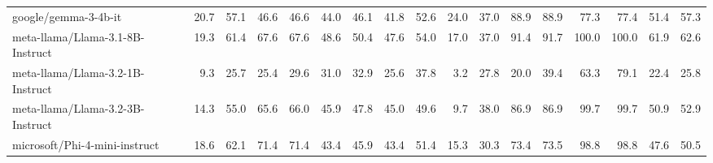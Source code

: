 \documentclass{article}
\begin{document}
\begin{table}[htbp]
\begin{threeparttable}
\begin{adjustbox}{max width=\textwidth}
\begin{tabular}{lrrrrrrrrrrrrrrrr}
google/gemma-3-4b-it & \cellcolor[HTML]{FEFDFC}20.7 & \cellcolor[HTML]{D3E8F1}57.1 & \cellcolor[HTML]{FEF9F7}46.6 & \cellcolor[HTML]{FEF9F6}46.6 & \cellcolor[HTML]{FEFDFD}44.0 & \cellcolor[HTML]{FBE3D8}46.1 & \cellcolor[HTML]{ECF4F9}41.8 & \cellcolor[HTML]{D6E9F2}52.6 & \cellcolor[HTML]{FEF7F4}24.0 & \cellcolor[HTML]{FBE5DB}37.0 & \cellcolor[HTML]{AAD1E5}88.9 & \cellcolor[HTML]{B6D8E9}88.9 & \cellcolor[HTML]{C3DFEC}77.3 & \cellcolor[HTML]{FAD9CB}77.4 & \cellcolor[HTML]{F3F8FB}51.4 & \cellcolor[HTML]{F0F7FA}57.3 \\
meta-llama/Llama-3.1-8B-Instruct & \cellcolor[HTML]{FEF7F4}19.3 & \cellcolor[HTML]{C4DFED}61.4 & \cellcolor[HTML]{D7EAF3}67.6 & \cellcolor[HTML]{D8EAF3}67.6 & \cellcolor[HTML]{F5F9FC}48.6 & \cellcolor[HTML]{FDEEE8}50.4 & \cellcolor[HTML]{DAEBF3}47.6 & \cellcolor[HTML]{D2E7F1}54.0 & \cellcolor[HTML]{FBDFD3}17.0 & \cellcolor[HTML]{FBE5DB}37.0 & \cellcolor[HTML]{A4CEE3}91.4 & \cellcolor[HTML]{ADD3E6}91.7 & \cellcolor[HTML]{92C5DE}100.0 & \cellcolor[HTML]{92C5DE}100.0 & \cellcolor[HTML]{DAEBF3}61.9 & \cellcolor[HTML]{E2EFF6}62.6 \\
meta-llama/Llama-3.2-1B-Instruct & \cellcolor[HTML]{F8CCB9}9.3 & \cellcolor[HTML]{F8C6B0}25.7 & \cellcolor[HTML]{F9D2C1}25.4 & \cellcolor[HTML]{FADACB}29.6 & \cellcolor[HTML]{FBE3D8}31.0 & \cellcolor[HTML]{F7BFA7}32.9 & \cellcolor[HTML]{FBE5DB}25.6 & \cellcolor[HTML]{FDF5F2}37.8 & \cellcolor[HTML]{F5AF91}3.2 & \cellcolor[HTML]{F7C0A8}27.8 & \cellcolor[HTML]{F8C9B4}20.0 & \cellcolor[HTML]{F5B295}39.4 & \cellcolor[HTML]{E2EFF6}63.3 & \cellcolor[HTML]{FBE3D8}79.1 & \cellcolor[HTML]{F9CFBD}22.4 & \cellcolor[HTML]{F8C6B0}25.8 \\
meta-llama/Llama-3.2-3B-Instruct & \cellcolor[HTML]{FBE2D6}14.3 & \cellcolor[HTML]{DBECF4}55.0 & \cellcolor[HTML]{DCECF4}65.6 & \cellcolor[HTML]{DBECF4}66.0 & \cellcolor[HTML]{FCFDFE}45.9 & \cellcolor[HTML]{FCE7DE}47.8 & \cellcolor[HTML]{E2EFF6}45.0 & \cellcolor[HTML]{E1EFF6}49.6 & \cellcolor[HTML]{F8C6B0}9.7 & \cellcolor[HTML]{FCE9E0}38.0 & \cellcolor[HTML]{AED4E6}86.9 & \cellcolor[HTML]{BDDCEB}86.9 & \cellcolor[HTML]{92C5DE}99.7 & \cellcolor[HTML]{94C6DE}99.7 & \cellcolor[HTML]{F4F9FB}50.9 & \cellcolor[HTML]{FCFDFE}52.9 \\
microsoft/Phi-4-mini-instruct & \cellcolor[HTML]{FDF4F0}18.6 & \cellcolor[HTML]{C2DEEC}62.1 & \cellcolor[HTML]{CFE5F0}71.4 & \cellcolor[HTML]{CFE5F0}71.4 & \cellcolor[HTML]{FEFCFB}43.4 & \cellcolor[HTML]{FBE2D7}45.9 & \cellcolor[HTML]{E7F2F7}43.4 & \cellcolor[HTML]{DBEBF4}51.4 & \cellcolor[HTML]{FAD9CB}15.3 & \cellcolor[HTML]{F8CAB6}30.3 & \cellcolor[HTML]{CBE3EF}73.4 & \cellcolor[HTML]{E9F3F8}73.5 & \cellcolor[HTML]{94C6DE}98.8 & \cellcolor[HTML]{9AC9E0}98.8 & \cellcolor[HTML]{FCFDFE}47.6 & \cellcolor[HTML]{FEFCFB}50.5 \\

\end{tabular}
\end{adjustbox}
\end{threeparttable}
\end{table}
\end{document}
